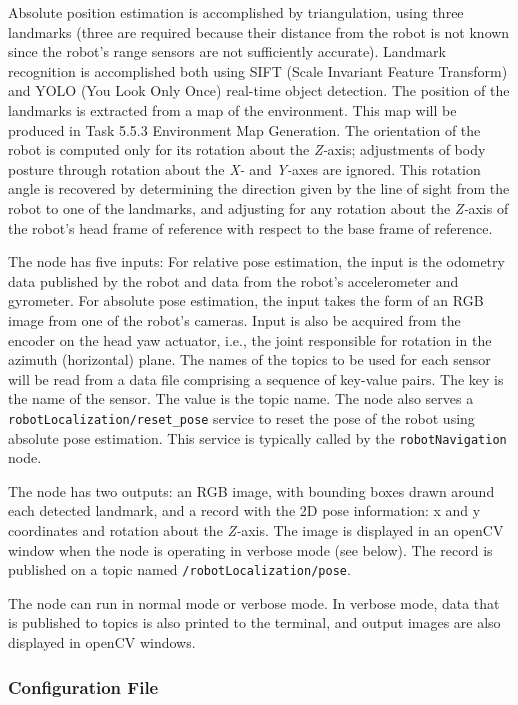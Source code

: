\documentclass{CSSRforAfrica}
\begin{document}
{{Absolute position estimation is accomplished by  triangulation, using  three landmarks (three are required because their distance from the robot is not known since the robot's range sensors are not sufficiently accurate). Landmark recognition is accomplished both using  SIFT (Scale Invariant Feature Transform) and YOLO (You Look Only Once) real-time object detection. The position of the landmarks is extracted from a map of the environment.   This map will be produced in Task 5.5.3 Environment Map Generation. The orientation of the robot is computed only for its rotation about the  {\em Z-}axis; adjustments of body posture through rotation about the {\em X-} and {\em Y-}axes are ignored.   This rotation angle is recovered by determining the direction given by the line of sight from the robot to one of the landmarks, and adjusting for any rotation about the  {\em Z-}axis of the robot's head frame of reference with respect to the base frame of reference. 

The node has five inputs: For relative pose estimation, the input is the odometry data published by the robot and  data from the robot's accelerometer and gyrometer.  For absolute pose estimation, the  input  takes the form of an RGB image from one of the robot's cameras.  Input is also be acquired from the encoder on the head yaw actuator, i.e., the joint responsible for rotation in the azimuth (horizontal) plane.  The names of the topics to be used for each sensor will be read from a data file comprising a sequence of key-value pairs. The key is the name of the sensor. The value is the topic name.     The node also serves a {\small \verb+robotLocalization/reset_pose+} service to reset the pose of the robot using absolute pose estimation. This service is typically called by the {\small \verb+robotNavigation+} node.
 
The node has two outputs: an RGB image, with bounding boxes drawn around each detected landmark, and a record with the 2D pose information: x and y coordinates and rotation about the  {\em Z-}axis.  The image is displayed in an openCV window when the node is operating in verbose mode (see below).  
The record is published on a  topic named {\small \verb+/robotLocalization/pose+}.  
 
The node can run in normal mode or verbose mode. In verbose mode, data that is published to topics is also printed to the terminal, and output images are also displayed in openCV windows.


\subsubsection*{Configuration File}

}}
\end{document}
